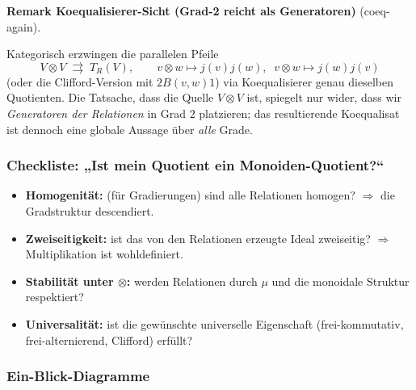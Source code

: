 \documentclass[10pt, letterpaper]{article}
\newcommand{\Cl}{\mathrm{Cl}}
\newcommand{\CustomHeading}[3]{%
  \par\medskip\noindent%
  \textbf{#1 #2} \textnormal{(#3)}.\enskip%
}
\newenvironment{REM}[2]{\begin{unitbox}\CustomHeading{Remark}{#1}{#2}}{\end{unitbox}}
\begin{document}
\begin{REM}{Koequalisierer-Sicht (Grad-2 reicht als Generatoren)}{coeq-again}
Kategorisch erzwingen die parallelen Pfeile
\[
V\otimes V \;\rightrightarrows\; T_R(V),\qquad
v\otimes w \mapsto j(v)j(w),\;\; v\otimes w \mapsto j(w)j(v)
\]
(oder die Clifford-Version mit $2B(v,w)1$) via Koequalisierer genau dieselben Quotienten.
Die Tatsache, dass die Quelle $V\otimes V$ ist, spiegelt nur wider, dass wir \emph{Generatoren der Relationen}
in Grad $2$ platzieren; das resultierende Koequalisat ist dennoch eine globale Aussage über \emph{alle} Grade.
\end{REM}



\subsubsection*{Checkliste: „Ist mein Quotient ein Monoiden-Quotient?“}
\begin{itemize}[leftmargin=*]
\item \textbf{Homogenität:} (für Gradierungen) sind alle Relationen homogen? \(\Rightarrow\) die Gradstruktur descendiert.
\item \textbf{Zweiseitigkeit:} ist das von den Relationen erzeugte Ideal zweiseitig? \(\Rightarrow\) Multiplikation ist wohldefiniert.
\item \textbf{Stabilität unter \(\otimes\):} werden Relationen durch \(\mu\) und die monoidale Struktur respektiert? 
\item \textbf{Universalität:} ist die gewünschte universelle Eigenschaft (frei-kommutativ, frei-alternierend, Clifford) erfüllt?
\end{itemize}

\subsubsection*{Ein-Blick-Diagramme}
\begin{center}

\medskip


\medskip

\end{center}
\end{document}
